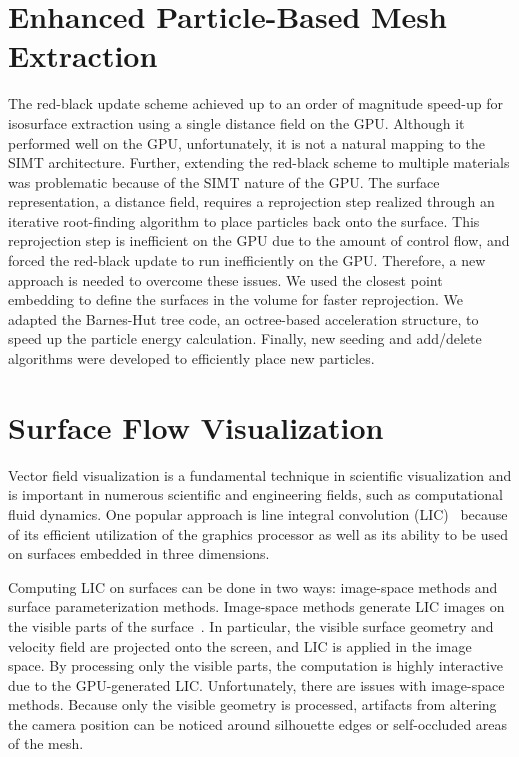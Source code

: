 \section{Enhanced Particle-Based Mesh Extraction}
The red-black update scheme achieved up to an order of magnitude speed-up for isosurface extraction using a single distance field on the GPU. Although it performed well on the GPU, unfortunately, it is not a natural mapping to the SIMT architecture. Further, extending the red-black scheme to multiple materials was problematic because of the SIMT nature of the GPU. The surface representation, a distance field, requires a reprojection step realized through an iterative root-finding algorithm to place particles back onto the surface. This reprojection step is inefficient on the GPU due to the amount of control flow, and forced the red-black update to run inefficiently on the GPU. Therefore, a new approach is needed to overcome these issues. We used the closest point embedding to define the surfaces in the volume for faster reprojection. We adapted the Barnes-Hut tree code, an octree-based acceleration structure, to speed up the particle energy calculation. Finally, new seeding and add/delete algorithms were developed to efficiently place new particles. 

\section{Surface Flow Visualization}
Vector field visualization is a fundamental technique in scientific visualization and is important in numerous scientific and engineering fields, such as computational fluid dynamics. One popular approach is line integral convolution (LIC)~\cite{Cabral:1993:IVF:166117.166151} because of its efficient utilization of the graphics processor as well as its ability to be used on surfaces embedded in three dimensions. 

Computing LIC on surfaces can be done in two ways: image-space methods and surface parameterization methods. Image-space methods generate LIC images on the visible parts of the surface~\cite{DBLP:conf/visualization/LarameeJH03,DBLP:conf/visualization/Wijk03}. In particular, the visible surface geometry and velocity field are projected onto the screen, and LIC is applied in the image space. By processing only the visible parts, the computation is highly interactive due to the GPU-generated LIC. Unfortunately, there are issues with image-space methods. Because only the visible geometry is processed, artifacts from altering the camera position can be noticed around silhouette edges or self-occluded areas of the mesh. 

